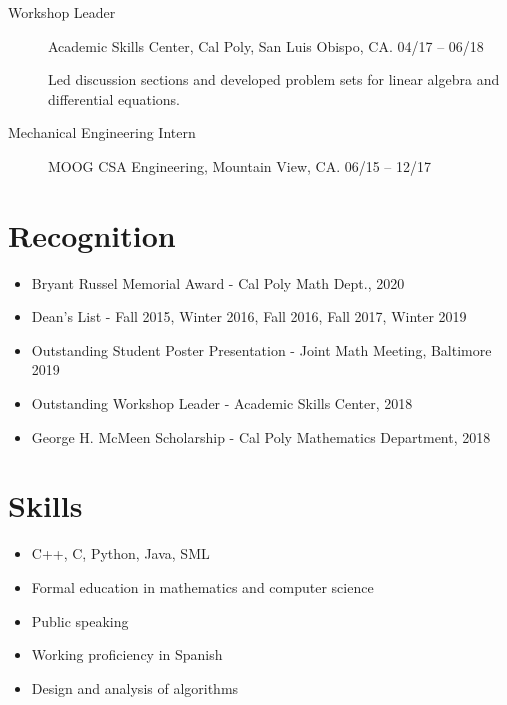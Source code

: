 \documentclass[11pt]{article}
\begin{document}
\begin{description}
    \item[Workshop Leader]

	Academic Skills Center, Cal Poly, San Luis Obispo, CA.  04/17 -- 06/18

	\begin{small}
	Led discussion sections and developed problem sets for linear algebra and differential equations.
	\end{small}

    \item[Mechanical Engineering Intern]

	MOOG CSA Engineering, Mountain View, CA.  06/15 -- 12/17

\end{description}

\section*{\textcolor{CalPolyGreen}{Recognition}}

\begin{itemize}
        \item Bryant Russel Memorial Award - Cal Poly Math Dept., 2020
        \item Dean's List - Fall 2015, Winter 2016, Fall 2016, Fall 2017, Winter 2019
        \item Outstanding Student Poster Presentation - Joint Math Meeting, Baltimore 2019
        \item Outstanding Workshop Leader - Academic Skills Center, 2018
        \item George H. McMeen Scholarship - Cal Poly Mathematics Department, 2018

\end{itemize}


\section*{\textcolor{CalPolyGreen}{Skills}}

\begin{itemize}
        \item C++, C, Python, Java, SML
        \item Formal education in mathematics and computer science
        \item Public speaking
        \item Working proficiency in Spanish
        \item Design and analysis of algorithms
\end{itemize}
\end{document}
